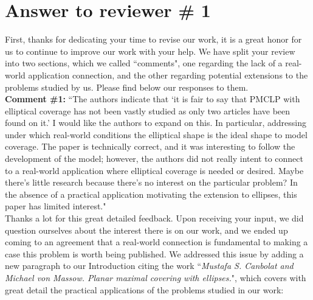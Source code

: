 
	
		
\section*{Answer to reviewer \# 1}
		
		
		First, thanks for dedicating your time to revise our work, it is a great honor for us to continue to improve our work with your help. We have split your review into two sections, which we called ``comments", one regarding the lack of a real-world application connection, and the other regarding potential extensions to the problems studied by us. Please find below our responses to them.
		\\
		
		\textbf{Comment \#1:} ``The authors indicate that `it is fair to say that PMCLP with elliptical coverage has not been vastly studied as only two articles have been found on it.' I would like the authors to expand on this. In particular, addressing under which real-world conditions the elliptical shape is the ideal shape to model coverage. The paper is technically correct, and it was interesting to follow the development of the model; however, the authors did not really intent to connect to a real-world application where elliptical coverage is needed or desired. Maybe there's little research because there's no interest on the particular problem? In the absence of a practical application motivating the extension to ellipses, this paper has limited interest."
		\\
		
		Thanks a lot for this great detailed feedback. 
		Upon receiving your input, we did question ourselves about the interest there is on our work, and we ended up coming to an agreement that a real-world connection is fundamental to making a case this problem is worth being published.
		We addressed this issue by adding a new paragraph to our Introduction citing the work ``\textit{Mustafa S. Canbolat and Michael von Massow. Planar maximal covering with ellipses.}", which covers with great detail the practical applications of the problems studied in our work:
		
